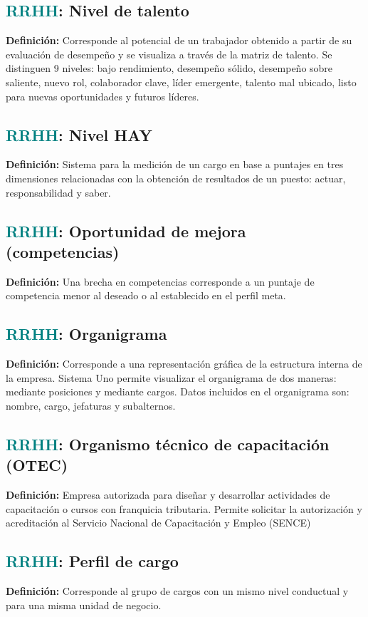 \documentclass[12pt]{article}
\begin{document}
\subsection{\textcolor{teal}{RRHH}: Nivel de talento}
\textbf{Definición:} Corresponde al potencial de un trabajador obtenido a partir de su evaluación de desempeño y se visualiza a través de la matriz de talento. Se distinguen 9 niveles: bajo rendimiento, desempeño sólido, desempeño sobre saliente, nuevo rol, colaborador clave, líder emergente, talento mal ubicado, listo para nuevas oportunidades y futuros líderes.
\subsection{\textcolor{teal}{RRHH}: Nivel HAY}
\textbf{Definición:} Sistema para la medición de un cargo en base a puntajes en tres dimensiones relacionadas con la obtención de resultados de un puesto: actuar, responsabilidad y saber.
\subsection{\textcolor{teal}{RRHH}: Oportunidad de mejora (competencias)}
\textbf{Definición:} Una brecha en competencias corresponde a un puntaje de competencia menor al deseado o al establecido en el perfil meta.
\subsection{\textcolor{teal}{RRHH}: Organigrama}
\textbf{Definición:} Corresponde a una representación gráfica de la estructura interna de la empresa. Sistema Uno permite visualizar el organigrama de dos maneras: mediante posiciones y mediante cargos. Datos incluidos en el organigrama son: nombre, cargo, jefaturas y subalternos.
\subsection{\textcolor{teal}{RRHH}: Organismo técnico de capacitación (OTEC)}
\textbf{Definición:} Empresa autorizada para diseñar y desarrollar actividades de capacitación o cursos con franquicia tributaria. Permite solicitar la autorización y acreditación al Servicio Nacional de Capacitación y Empleo (SENCE)
\subsection{\textcolor{teal}{RRHH}: Perfil de cargo}
\textbf{Definición:} Corresponde al grupo de cargos con un mismo nivel conductual y para una misma unidad de negocio.
\end{document}
